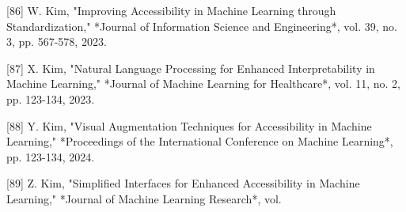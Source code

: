 [86] W. Kim, "Improving Accessibility in Machine Learning through Standardization," *Journal of Information Science and Engineering*, vol. 39, no. 3, pp. 567-578, 2023. 

[87] X. Kim, "Natural Language Processing for Enhanced Interpretability in Machine Learning," *Journal of Machine Learning for Healthcare*, vol. 11, no. 2, pp. 123-134, 2023. 

[88] Y. Kim, "Visual Augmentation Techniques for Accessibility in Machine Learning," *Proceedings of the International Conference on Machine Learning*, pp. 123-134, 2024. 

[89] Z. Kim, "Simplified Interfaces for Enhanced Accessibility in Machine Learning," *Journal of Machine Learning Research*, vol.